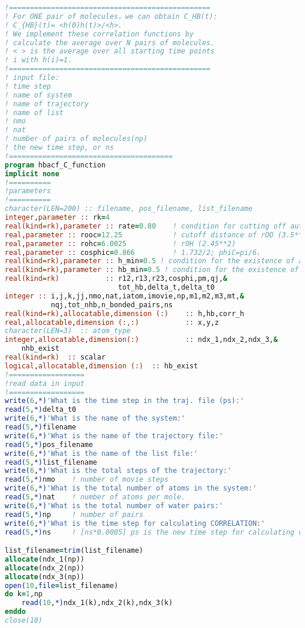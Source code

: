 \begin{lstlisting}[language=fortran]
!================================================
! For ONE pair of molecules，we can obtain C_HB(t):
! C_{HB}(t)= <h(0)h(t)>/<h>.
! We implement these correlation functions by
! calculate the average over N pairs of molecules.
! < > is the average over all starting time points
! i with h(i)=1.
!================================================
! input file: 
! time step
! name of system
! name of trajectory
! name of list
! nmo
! nat
! number of pairs of molecules(np)
! the new time step, or ns
!=======================================
program hbacf_C_function
implicit none
!==========
!parameters
!==========
character(LEN=200) :: filename, pos_filename, list_filename
integer,parameter :: rk=4
real(kind=rk),parameter :: rate=0.80    ! condition for cutting off auto-correlation functions
real,parameter :: rooc=12.25            ! cutoff distance of rOO (3.5**2)
real,parameter :: rohc=6.0025           ! rOH (2.45**2)
real,parameter :: cosphic=0.866         ! 1.732/2; phiC=pi/6.
real(kind=rk),parameter :: h_min=0.5 ! condition for the existence of a h-bond for a step
real(kind=rk),parameter :: hb_min=0.5 ! condition for the existence of h-bond for a pair of water molecules
real(kind=rk)           :: r12,r13,r23,cosphi,pm,qj,&
                           tot_hb,delta_t,delta_t0
integer :: i,j,k,jj,nmo,nat,iatom,imovie,np,m1,m2,m3,mt,&
           nqj,tot_nhb,n_bonded_pairs,ns
real(kind=rk),allocatable,dimension (:)    :: h,hb,corr_h
real,allocatable,dimension (:,:)           :: x,y,z
character(LEN=3)  :: atom_type    
integer,allocatable,dimension(:)           :: ndx_1,ndx_2,ndx_3,&
    nhb_exist
real(kind=rk)  :: scalar
logical,allocatable,dimension (:)  :: hb_exist
!==================
!read data in input
!==================
write(6,*)'What is the time step in the traj. file (ps):'
read(5,*)delta_t0
write(6,*)'What is the name of the system:'
read(5,*)filename
write(6,*)'What is the name of the trajectory file:'
read(5,*)pos_filename
write(6,*)'What is the name of the list file:'
read(5,*)list_filename
write(6,*)'What is the total steps of the trajectory:'
read(5,*)nmo    ! number of movie steps
write(6,*)'What is the total number of atoms in the system:'
read(5,*)nat    ! number of atoms per mole.
write(6,*)'What is the total number of water pairs:'
read(5,*)np     ! number of pairs
write(6,*)'What is the time step for calculating CORRELATION:'
read(5,*)ns     ! [ns*0.0005] ps is the new time step for calculating correl func.

list_filename=trim(list_filename)
allocate(ndx_1(np))
allocate(ndx_2(np))
allocate(ndx_3(np))
open(10,file=list_filename)
do k=1,np
    read(10,*)ndx_1(k),ndx_2(k),ndx_3(k)
enddo
close(10)


\end{lstlisting}

